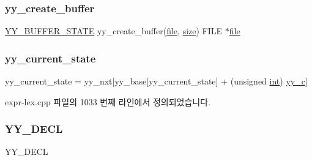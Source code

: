 \mbox{\label{expr-lex_8cpp_a55588ac24161be2160e907e019dcae5c}} 
\subsubsection{\texorpdfstring{yy\+\_\+create\+\_\+buffer}{yy\_create\_buffer}}
{\footnotesize\ttfamily \mbox{\hyperlink{expr-lex_8cpp_a4e5bd2d129903df83f3d13effaf8f3e4}{Y\+Y\+\_\+\+B\+U\+F\+F\+E\+R\+\_\+\+S\+T\+A\+TE}} yy\+\_\+create\+\_\+buffer(\mbox{\hyperlink{expr-lex_8cpp_a702945180aa732857b380a007a7e2a21}{file}}, \mbox{\hyperlink{expr-lex_8cpp_ab7d671599a7b25ca99a487fa341bc33a}{size}}) F\+I\+LE $\ast$\mbox{\hyperlink{expr-lex_8cpp_a702945180aa732857b380a007a7e2a21}{file}}}

\mbox{\label{expr-lex_8cpp_abb8b9672f94e21056888ae611b41cd1b}} 
\subsubsection{\texorpdfstring{yy\+\_\+current\+\_\+state}{yy\_current\_state}}
{\footnotesize\ttfamily yy\+\_\+current\+\_\+state = yy\+\_\+nxt\mbox{[}yy\+\_\+base\mbox{[}yy\+\_\+current\+\_\+state\mbox{]} + (unsigned \mbox{\hyperlink{_util_8cpp_a0ef32aa8672df19503a49fab2d0c8071}{int}}) \mbox{\hyperlink{expr-lex_8cpp_a2ce7598a28e3deb63b5ef934b031a93f}{yy\+\_\+c}}\mbox{]}}



expr-\/lex.\+cpp 파일의 1033 번째 라인에서 정의되었습니다.

\mbox{\label{expr-lex_8cpp_abcefb20c54ce0f92452cfbb9cf657670}} 
\subsubsection{\texorpdfstring{Y\+Y\+\_\+\+D\+E\+CL}{YY\_DECL}}
{\footnotesize\ttfamily Y\+Y\+\_\+\+D\+E\+CL}

